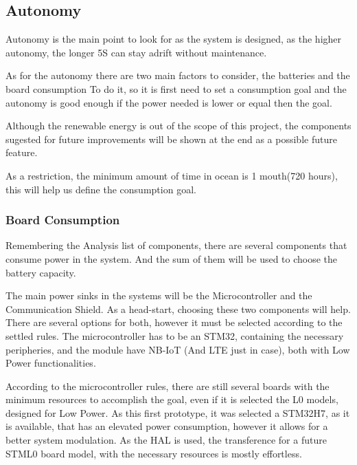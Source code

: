 \subsection{Autonomy}
Autonomy is the main point to look for as the system is designed, as the higher autonomy, 
the longer 5S can stay adrift without maintenance.

As for the autonomy there are two main factors to consider, the batteries and the board 
consumption To do it, so it is first need to set a consumption goal and the autonomy is 
good enough if the power needed is lower or equal then the goal.

Although the renewable energy is out of the scope of this project, the components sugested
for future improvements will be shown at the end as a possible future feature. 

As a restriction, the minimum amount of time in ocean is 1 mouth(720 hours), this will help us 
define the consumption goal.

\subsubsection{Board Consumption}
\label{link:Board Consumption}
Remembering the Analysis list of components, there are several components that consume
power in the system. And the sum of them will be used to choose the battery capacity.

The main power sinks in the systems will be the Microcontroller and the 
Communication Shield. As a head-start, choosing these two components will help. There are
several options for both, however it must be selected according to the settled rules. The
microcontroller has to be an STM32, containing the necessary peripheries, and the module have NB-IoT (And LTE just in case), both
with Low Power functionalities.

According to the microcontroller rules, there are still several boards with the minimum
resources to accomplish the goal, even if it is selected the L0 models, designed for 
Low Power. As this first prototype, it was selected a STM32H7, as it is available, 
that has an elevated power consumption, however it allows for a better system 
modulation. As the HAL is used, the transference for a future STML0 board model, 
with the necessary resources is mostly effortless. 

